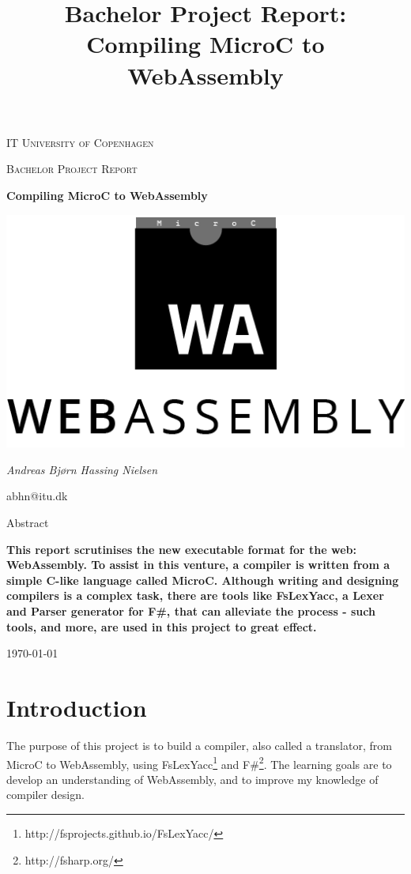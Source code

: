 \documentclass[a4paper]{article}
\title{Bachelor Project Report: Compiling MicroC to WebAssembly}
\begin{document}

\begin{titlepage}
	\centering
	{\scshape\LARGE IT University of Copenhagen \par}
	\vspace{1cm}
	{\scshape\Large Bachelor Project Report\par}
	\vspace{1.5cm}
	{\huge\bfseries Compiling MicroC to WebAssembly \par}
	\vspace{2cm}
	{\includegraphics{WebAssemblyLogo} \par}
	\vspace{2cm}
	{\Large\itshape Andreas Bjørn Hassing Nielsen\par}
	abhn@itu.dk\\
	\vspace{2cm}
	{\Large Abstract\par}
	{\bfseries This report scrutinises the new executable format for the web: WebAssembly. To assist in this venture, a compiler is written from a simple C-like language called MicroC. Although writing and designing compilers is a complex task, there are tools like FsLexYacc, a Lexer and Parser generator for F\#, that can alleviate the process - such tools, and more, are used in this project to great effect.}
	\vfill
	{\large \today\par}
\end{titlepage}
\newpage

\tableofcontents

\newpage
\section{Introduction}
\label{sec:introduction}
The purpose of this project is to build a compiler, also called a translator, from MicroC to WebAssembly, using FsLexYacc\footnote{\label{footnote:fslexyacc-url}http://fsprojects.github.io/FsLexYacc/} and F\#\footnote{http://fsharp.org/}. The learning goals are to develop an understanding of WebAssembly, and to improve my knowledge of compiler design.
\end{document}
